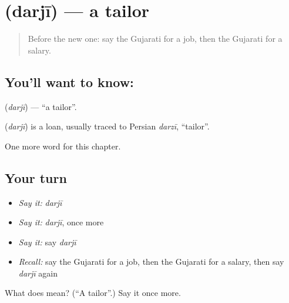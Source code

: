 \section[\texorpdfstring{\gu{દરજી} (darjī)}{દરજી (darjī)}]{ (darjī) — a tailor}

\label{lesson:GU-C130-darji}



\begin{quote}
Before the new one: say the Gujarati for a job, then the Gujarati for a salary.
\end{quote}

\subsection*{You'll want to know: }
\textbf{} (\emph{darjī}) — \textquotedblleft{}a tailor\textquotedblright{}.

\begin{cousinweb}
\textbf{} (\emph{darjī}) is a loan, usually traced to Persian \emph{darzī}, \textquotedblleft{}tailor\textquotedblright{}.
\end{cousinweb}

\begin{grammarlens}[title={What you've built}]
One more word for this chapter.
\end{grammarlens}

\subsection*{Your turn}
\begin{itemize}
\raggedright
  \item \emph{Say it:} \emph{darjī}
  \item \emph{Say it:} \emph{darjī}, once more
  \item \emph{Say it:} say \emph{darjī}
  \item \emph{Recall:} say the Gujarati for a job, then the Gujarati for a salary, then say \emph{darjī} again
\end{itemize}

\begin{tcolorbox}[breakable,colback=teal!4,colframe=teal!35!black,title={Before you move on}]
What does  mean? (\textquotedblleft{}A tailor\textquotedblright{}.) Say it once more.
\end{tcolorbox}
